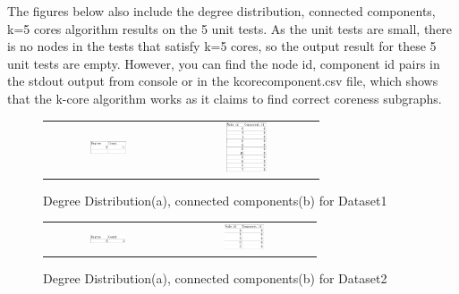 The figures below also include the degree distribution, connected components, k=5 cores algorithm results on the 5 unit tests.
As the unit tests are small, there is no nodes in the tests that satisfy k=5 cores, so the output result for these 5 
unit tests are empty. 
However, you can find the node id, component id pairs in the stdout output from console or in the kcorecomponent.csv file, which shows that the k-core
algorithm works as it claims to find correct coreness subgraphs.

\begin{figure}[H]
\begin{center}
\begin{tabular}{cc}
     \includegraphics[width=0.3\textwidth]{FIG/1dd.jpg} &
     \includegraphics[width=0.3\textwidth]{FIG/1cc.jpg} \\
\end{tabular}
\caption{Degree Distribution(a), connected components(b) for Dataset1}
\end{center}
\end{figure}

\begin{figure}[H]
\begin{center}
\begin{tabular}{cc}
     \includegraphics[width=0.3\textwidth]{FIG/2dd.jpg} &
     \includegraphics[width=0.3\textwidth]{FIG/2cc.jpg} \\
\end{tabular}
\caption{Degree Distribution(a), connected components(b) for Dataset2}
\end{center}
\end{figure}

